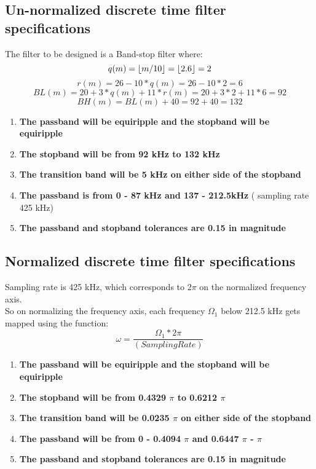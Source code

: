 \documentclass[12pt]{article}
\DeclarePairedDelimiter\floor{\lfloor}{\rfloor}
\begin{document}
\subsection{Un-normalized discrete time filter specifications}

  
    The filter to be designed is a Band-stop filter where:
    \begin{equation}
        q(m) = \floor{m/10} = \floor{2.6} = 2
    \end{equation}
    \begin{equation}
        r(m) = 26 - 10*q(m) = 26 - 10*2 = 6
    \end{equation}
    \begin{equation}
        BL(m) = 20 + 3*q(m) + 11*r(m) = 20 + 3*2 + 11*6 = 92
    \end{equation}
    \begin{equation}
        BH(m) = BL(m) + 40 = 92 + 40 = 132
    \end{equation}
  

    \begin{enumerate}
    \item \textbf{The passband will be equiripple and the stopband will be equiripple}
    \item \textbf{The stopband will be from 92 kHz to 132 kHz}
    \item \textbf{The transition band will be 5 kHz on either side of the stopband}
    \item \textbf{The passband is from 0 - 87 kHz and 137 - 212.5kHz} ( sampling rate 425 kHz)
    \item \textbf{The passband and stopband tolerances are 0.15 in magnitude}

\end{enumerate}
\subsection{Normalized discrete time filter specifications}
Sampling rate is 425 kHz, which corresponds to 2$\pi$ on the normalized frequency axis.
\\So on normalizing the frequency axis, each frequency $\Omega_1$ below 212.5 kHz gets mapped using the function:
\begin{equation}
    \omega=\frac{\Omega_1 * 2 \pi}{(Sampling Rate)}
\end{equation}
\begin{enumerate}
    \item \textbf{The passband will be equiripple and the stopband will be equiripple}
    \item \textbf{The stopband will be from 0.4329 $\pi$ to 0.6212 $\pi$}
    \item \textbf{The transition band will be 0.0235 $\pi$ on either side of the stopband}
    \item \textbf{The passband will be from 0 - 0.4094 $\pi$ and 0.6447 $\pi$ - $\pi$} 
    \item \textbf{The passband and stopband tolerances are 0.15 in magnitude}

\end{enumerate}
\end{document}
